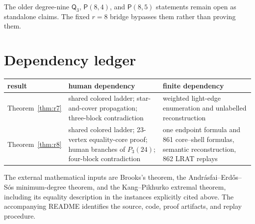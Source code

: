 \documentclass[11pt,reqno,a4paper]{amsart}
\theoremstyle{definition}
\theoremstyle{remark}
\begin{document}
The older degree-nine $\mathsf Q_3$, $\mathsf P(8,4)$, and
$\mathsf P(8,5)$ statements remain open as standalone claims. The fixed
$r=8$ bridge bypasses them rather than proving them.

\appendix
\section{Dependency ledger}

\begin{center}
\begin{tabular}{L{0.25\textwidth}L{0.31\textwidth}L{0.32\textwidth}}
\toprule
result&human dependency&finite dependency\\
\midrule
Theorem~\ref{thm:r7}&shared colored ladder; star-and-cover propagation;
three-block contradiction&weighted light-edge enumeration and unlabelled
reconstruction\\
Theorem~\ref{thm:r8}&shared colored ladder; 23-vertex equality-core proof;
human branches of $P_3(24)$; four-block contradiction&one endpoint formula
and 861 core--shell formulas, semantic reconstruction, 862 LRAT replays\\
\bottomrule
\end{tabular}
\end{center}

The external mathematical inputs are Brooks's theorem, the
Andr\'asfai--Erd\H{o}s--S\'os minimum-degree theorem, and the
Kang--Pikhurko extremal theorem, including its equality description in
the instances explicitly cited above. The accompanying README identifies
the source, code, proof artifacts, and replay procedure.



\end{document}
